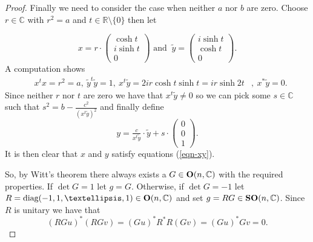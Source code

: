 \documentclass[10pt,a4paper]{amsart}
\def \OC#1{\text{\bf O}(#1,\cn)}
\def \SOC#1{\text{\bf SO}(#1,\cn)}
\def \cn{{\mathbb C}}
\def \rn{{\mathbb R}}
\begin{document}
\begin{proof}
	Finally we need to consider the case when neither $a$ nor $b$ are zero. Choose $r \in \cn$ with $r^2 = a$ and $t \in \rn \setminus \{0\}$ then let 
	
		$$ x = r \cdot \begin{pmatrix}
		\cosh t \\ i \sinh t \\ 0
	\end{pmatrix} \text{ and }  \ \tilde y = \begin{pmatrix}
		i\sinh t\\ \cosh t\\ 0
	\end{pmatrix}.$$ 
	A computation shows
 \begin{eqnarray*}
 	& x^t x = r^2 = a, \  \tilde y^t \tilde y =1, \  x^t \tilde y= 2i r \cosh t \sinh t = i r \sinh 2t&, \ x^* \tilde y=0.
 \end{eqnarray*}
 Since neither $r$ nor $t$ are zero we have that $x^t \tilde y \neq 0$ so we can pick some $s \in \cn$ such that $s^2 = b-\frac{c^2}{(x^t \tilde y)^2}$ and finally define
 $$ y = \tfrac{c}{x^t \tilde y} \cdot \tilde y + s \cdot \begin{pmatrix}
 	0 \\ 0 \\ 1
 \end{pmatrix}.$$
 It is then clear that $x$ and $y$ satisfy equations (\ref{eqn-xy}).
 
 So, by Witt's theorem there always exists a $G \in \OC{n}$ with the required properties. If $\det G =1$ let $g = G$. Otherwise, if $\det G = -1$ let $R = \text{diag}(-1,1,\dots ,1) \in \OC{n}$ and set $g = RG \in \SOC{n}$. Since $R$ is unitary we have that
	$$ (RGu)^*(RGv) = (Gu)^*R^*R(Gv) =(Gu)^*Gv=0.$$

 
\end{proof}
\end{document}
